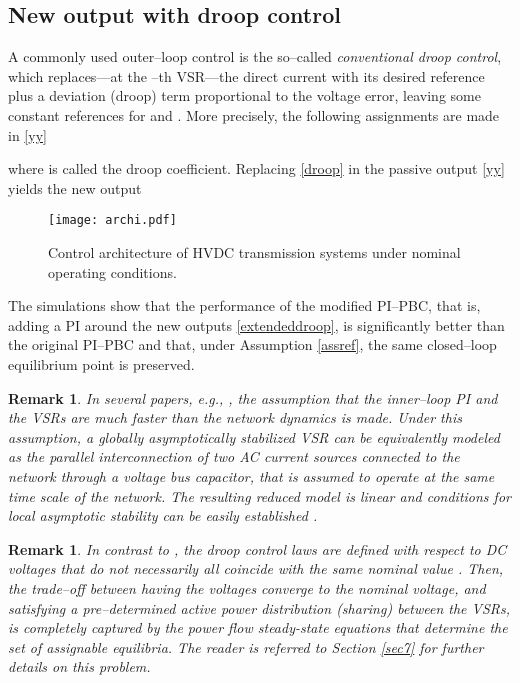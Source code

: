 \documentclass[5p,twocolumn]{elsarticle}
\def\begrem{\begin{remark}\rm}
\def\endrem{\end{remark}}
\newtheorem{remark}[theorem]{Remark}
\numberwithin{equation}{section}
\begin{document}
\subsection{New output with droop control}
A commonly used outer--loop control is the so--called {\em conventional droop control}, which replaces---at the --th VSR---the direct current  with its desired reference  plus a deviation (droop) term proportional to the voltage error, leaving some constant references for   and  . More precisely, the following assignments are made in  \eqref{yy}

where  is called the droop coefficient. 
Replacing \eqref{droop} in the passive output \eqref{yy} yields the new output


\begin{figure*}[ht]
 \centering
 \texttt{[image: archi.pdf]}
\caption{{Control architecture of HVDC transmission systems under nominal operating conditions.}}
 \label{droopfg}
\end{figure*}
The simulations show that the performance of the modified PI--PBC, that is, adding a PI around the new outputs \eqref{extendeddroop}, is significantly better than the original PI--PBC and that, under Assumption \ref{assref}, the same closed--loop equilibrium point is preserved. 




\begin{remark}\em
In several papers, {\em e.g.},  \cite{sandberg,bencha}, the assumption that the inner--loop PI and the VSRs are much faster than the network dynamics is made. Under this assumption, a globally asymptotically stabilized VSR can be equivalently modeled as the parallel interconnection of two AC current sources connected to the network through a voltage bus capacitor, that is assumed to operate at the same time scale of the network. The resulting reduced model is linear and conditions for {\em local} asymptotic stability can be easily established \cite{sandberg,dorfler}.
\end{remark}
\begrem
In contrast to \cite{sandberg,sun}, the droop control laws are defined with respect to DC voltages that do not necessarily all coincide with the same nominal value . Then, the trade--off between having the voltages converge to the nominal voltage, and satisfying a pre--determined active power distribution (\textit{sharing}) between the VSRs, is completely captured by the power flow steady-state equations that determine the set of assignable equilibria. The reader is referred to Section \ref{sec7} for further details on this problem.
\endrem
\end{document}
